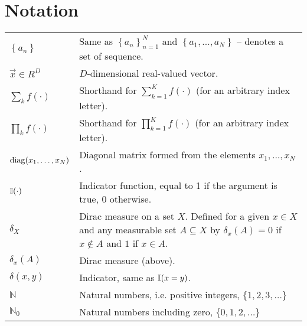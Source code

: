 \chapter{Notation}
\begin{table}[h]
\begin{tabulary}{1\textwidth}{lL}
    $\left\{a_n\right\}$                & Same as $\left\{a_n\right\}_{n = 1}^N$ and $\left\{a_1, \dotsc, a_N\right\}$ -- denotes a set of sequence. \\
    $\vec x \in R^D$                    & $D$-dimensional real-valued vector. \\
    $\sum_k f(\cdot)$                   & Shorthand for $\sum_{k = 1}^K f(\cdot)$ (for an arbitrary index letter). \\
    $\prod_k f(\cdot)$                  & Shorthand for $\prod_{k = 1}^K f(\cdot)$ (for an arbitrary index letter). \\
    $\operatorname{diag}(x_1, \dotsc, x_N)$           & Diagonal matrix formed from the elements $x_1, \dotsc, x_N$. \\
    $\operatorname{\mathbb I}(\cdot)$							& Indicator function, equal to 1 if the argument is true, 0 otherwise. \\
    $\delta_X$							& Dirac measure on a set $X$. Defined for a given $x \in X$ and any measurable set $A \subseteq X$ by $\delta_x(A) = 0$ if $x \notin A$ and $1$ if $x \in A$. \\
    $\delta_x(A)$						& Dirac measure (above). \\
    $\delta(x, y)$						& Indicator, same as $\operatorname{\mathbb I}(x = y)$. \\
    $\mathbb N$							& Natural numbers, i.e. positive integers, $\{1, 2, 3, \dotsc\}$ \\
    $\mathbb N_0$						& Natural numbers including zero, $\{0, 1, 2, \dotsc\}$
\end{tabulary}
\end{table}